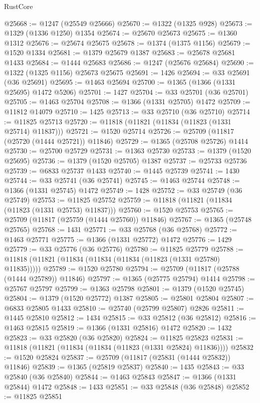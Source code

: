 \begin{lexlean}{RustCore}
\begin{coremodule}
@25668 := @1247 (@25549 @25666)
@25670 := @1322 (@1325 @928)
@25673 := @1329 (@1336 @1250) @1354
@25674 := @25670 @25673
@25675 := @1360 @1312
@25676 := @25674 @25675
@25678 := @1374 (@1375 @1156)
@25679 := @1520 @1334
@25681 := @1379 @25679 @1387
@25683 := @25678 @25681 @1433
@25684 := @1444 @25683
@25686 := @1247 (@25676 @25684)
@25690 := @1322 (@1325 @1156) @25673 @25675
@25691 := 1426
@25694 := @33 @25691 (@36 @25691)
@25695 := @1463 @25694
@25700 := @1365 (@1366 (@1331 @25695) @1472 @5206)
@25701 := 1427
@25704 := @33 @25701 (@36 @25701)
@25705 := @1463 @25704
@25708 := @1366 (@1331 @25705) @1472
@25709 := @11812 @14079
@25710 := 1425
@25713 := @33 @25710 (@36 @25710)
@25714 := @11825 @25713
@25720 := @11818 (@11821 (@11834 (@11823 (@1331 @25714) @11837)))
@25721 := @1520 @25714
@25726 := @25709 (@11817 (@25720 (@1444 @25721)) @11846)
@25729 := @1365 (@25708 @25726) @1414
@25730 := @25700 @25729
@25731 := @1363 @25730
@25733 := @1379 (@1520 @25695)
@25736 := @1379 (@1520 @25705) @1387
@25737 := @25733 @25736
@25739 := @6833 @25737 @1433
@25740 := @1445 @25739
@25741 := 1430
@25744 := @33 @25741 (@36 @25741)
@25745 := @1463 @25744
@25748 := @1366 (@1331 @25745) @1472
@25749 := 1428
@25752 := @33 @25749 (@36 @25749)
@25753 := @11825 @25752
@25759 := @11818 (@11821 (@11834 (@11823 (@1331 @25753) @11837)))
@25760 := @1520 @25753
@25765 := @25709 (@11817 (@25759 (@1444 @25760)) @11846)
@25767 := @1365 (@25748 @25765)
@25768 := 1431
@25771 := @33 @25768 (@36 @25768)
@25772 := @1463 @25771
@25775 := @1366 (@1331 @25772) @1472
@25776 := 1429
@25779 := @33 @25776 (@36 @25776)
@25780 := @11825 @25779
@25788 := @11818 (@11821 (@11834 (@11834 (@11834 (@11823 (@1331 @25780) @11835)))))
@25789 := @1520 @25780
@25794 := @25709 (@11817 (@25788 (@1444 @25789)) @11846)
@25797 := @1365 (@25775 @25794) @1414
@25798 := @25767 @25797
@25799 := @1363 @25798
@25801 := @1379 (@1520 @25745)
@25804 := @1379 (@1520 @25772) @1387
@25805 := @25801 @25804
@25807 := @6833 @25805 @1433
@25810 := @25740 (@25799 @25807) @2826
@25811 := @1445 @25810
@25812 := 1434
@25815 := @33 @25812 (@36 @25812)
@25816 := @1463 @25815
@25819 := @1366 (@1331 @25816) @1472
@25820 := 1432
@25823 := @33 @25820 (@36 @25820)
@25824 := @11825 @25823
@25831 := @11818 (@11821 (@11834 (@11834 (@11823 (@1331 @25824) @11836))))
@25832 := @1520 @25824
@25837 := @25709 (@11817 (@25831 (@1444 @25832)) @11846)
@25839 := @1365 (@25819 @25837)
@25840 := 1435
@25843 := @33 @25840 (@36 @25840)
@25844 := @1463 @25843
@25847 := @1366 (@1331 @25844) @1472
@25848 := 1433
@25851 := @33 @25848 (@36 @25848)
@25852 := @11825 @25851

\end{coremodule}
\end{lexlean}
